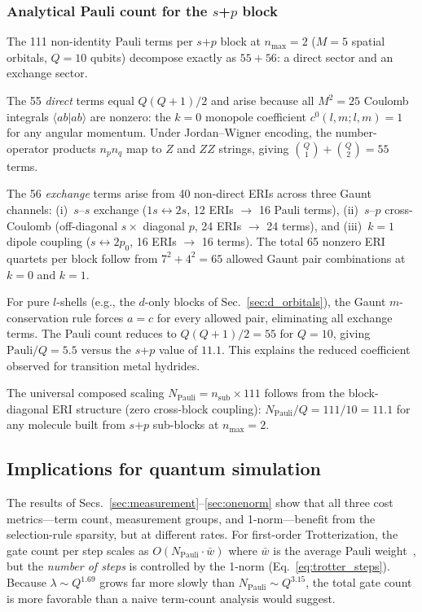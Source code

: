 \documentclass[aps,pra,twocolumn,superscriptaddress,longbibliography]{revtex4-2}
\begin{document}
\subsubsection{Analytical Pauli count for the $s$+$p$ block}
\label{sec:111}

The 111 non-identity Pauli terms per $s$+$p$ block at $n_{\max}=2$ ($M=5$
spatial orbitals, $Q=10$ qubits) decompose exactly as $55 + 56$: a direct
sector and an exchange sector.

The 55 \emph{direct} terms equal $Q(Q+1)/2$ and arise because all $M^2 = 25$
Coulomb integrals $\langle ab | ab \rangle$ are nonzero: the $k=0$ monopole
coefficient $c^0(l,m;l,m) = 1$ for any angular momentum.  Under
Jordan--Wigner encoding, the number-operator products $n_p n_q$ map to $Z$
and $ZZ$ strings, giving $\binom{Q}{1} + \binom{Q}{2} = 55$ terms.

The 56 \emph{exchange} terms arise from 40 non-direct ERIs across three
Gaunt channels: (i)~$s$--$s$ exchange ($1s \leftrightarrow 2s$, 12 ERIs
$\to$ 16 Pauli terms), (ii)~$s$--$p$ cross-Coulomb (off-diagonal $s \times$
diagonal $p$, 24 ERIs $\to$ 24 terms), and (iii)~$k=1$ dipole coupling
($s \leftrightarrow 2p_0$, 16 ERIs $\to$ 16 terms).  The total 65 nonzero
ERI quartets per block follow from $7^2 + 4^2 = 65$ allowed Gaunt pair
combinations at $k=0$ and $k=1$.

For pure $l$-shells (e.g., the $d$-only blocks of Sec.~\ref{sec:d_orbitals}),
the Gaunt $m$-conservation rule forces $a = c$ for every allowed pair,
eliminating all exchange terms.  The Pauli count reduces to $Q(Q+1)/2 = 55$
for $Q=10$, giving $\text{Pauli}/Q = 5.5$ versus the $s$+$p$ value of $11.1$.
This explains the reduced coefficient observed for transition metal hydrides.

The universal composed scaling $N_{\text{Pauli}} = n_{\text{sub}} \times 111$
follows from the block-diagonal ERI structure (zero cross-block coupling):
$N_{\text{Pauli}} / Q = 111/10 = 11.1$ for any molecule built from $s$+$p$
sub-blocks at $n_{\max} = 2$.

\subsection{Implications for quantum simulation}
\label{sec:trotter}

The results of Secs.~\ref{sec:measurement}--\ref{sec:onenorm}
show that all three cost metrics---term count, measurement groups,
and 1-norm---benefit from the selection-rule sparsity, but at
different rates.  For first-order Trotterization, the gate count per
step scales as $O(N_{\mathrm{Pauli}} \cdot \bar{w})$ where $\bar{w}$
is the average Pauli weight~\cite{childs2021}, but the
\emph{number of steps} is controlled by the 1-norm
(Eq.~\ref{eq:trotter_steps}).  Because $\lambda \sim Q^{1.69}$ grows
far more slowly than $N_{\mathrm{Pauli}} \sim Q^{3.15}$, the total
gate count is more favorable than a naive term-count analysis would
suggest.
\end{document}
